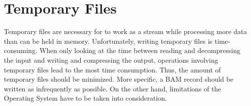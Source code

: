 \section{Temporary Files} \label{tempfiles}

Temporary files are necessary for \sort to work as a stream while processing more data than can be held in memory. Unfortunately, writing temporary files is time-consuming. When only looking at the time between reading and decompressing the input and writing and compressing the output, operations involving temporary files lead to the most time consumption. Thus, the amount of temporary files should be minimized. More specific, a BAM record should be written as infrequently as possible. On the other hand, limitations of the Operating System have to be taken into consideration.

